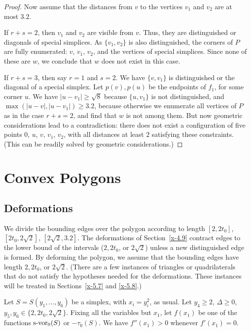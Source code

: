 \begin{proof}
Now assume that the distances from $v$ to the vertices $v_1$ and
$v_2$ are at most $3.2$.

If $r+s=2$, then $v_1$ and $v_2$ are visible from $v$. Thus, they
are distinguished or diagonals of special simplices. As
$\{v_1,v_2\}$ is also distinguished, the corners of $P$ are fully
enumerated: $v$, $v_1$, $v_2$, and the vertices of special
simplices.  Since none of these are $w$, we conclude that $w$ does
not exist in this case.

If $r+s=3$, then say $r=1$ and $s=2$. We have $\{v,v_1\}$ is
distinguished or the diagonal of a special simplex. Let
$p(v),p(u)$ be the endpoints of $f_1$, for some corner $u$. We
have $|u-v_1|\ge\sqrt8$ because $\{u,v_1\}$ is not distinguished,
and $\max(|u-v|,|u-v_1|)\ge3.2$, because otherwise we enumerate
all vertices of $P$ as in the case $r+s=2$, and find that $w$ is
not among them. But now geometric considerations lead to a
contradiction: there does not exist a configuration of five points
$0$, $u$, $v$, $v_1$, $v_2$, with all distances at least $2$
satisfying these constraints. (This can be readily solved by
geometric considerations.)
\end{proof}


\chapter{Convex Polygons}

\section{Deformations}
We divide the bounding edges over the polygon according to length
$[2,2t_0]$, $[2t_0,2\sqrt{2}]$, $[2\sqrt{2},3.2]$. The deformations of
Section~\ref{x-4.9} contract edges to the lower bound of the intervals
($2,2t_0$, or $2\sqrt{2}$) unless a new distinguished edge is formed. By
deforming the polygon, we assume that the bounding edges have length
$2,2t_0$, or $2\sqrt{2}$. (There are a few instances of triangles or
quadrilaterals that do not satisfy the hypotheses needed for the
deformations. These instances will be treated in Sections~\ref{x-5.7}
and \ref{x-5.8}.)

\begin{lemma}
Let $S=S(y_1,\ldots,y_6)$ be a simplex, with $x_i=y_i^2$,
as usual.  Let $y_4\ge 2$, $\Delta\ge0$,
    $y_5,y_6\in\{2,2t_0,2\sqrt{2}\}$.
Fixing all the variables but $x_1$, let $f(x_1)$ be one of the
functions $\operatorname{s-vor}_0(S)$ or $-\tau_0(S)$. We have $f''(x_1)>0$
whenever $f'(x_1)=0$.
\end{lemma}

